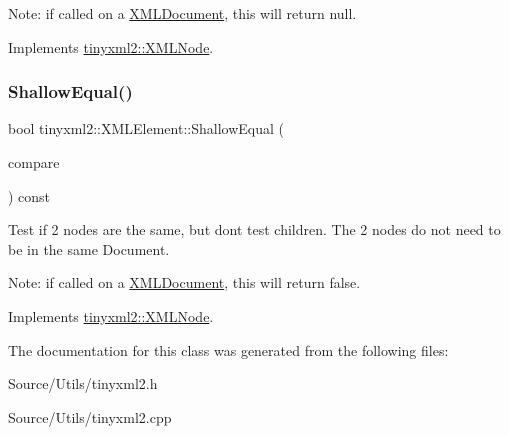 Note\+: if called on a \mbox{\hyperlink{classtinyxml2_1_1_x_m_l_document}{X\+M\+L\+Document}}, this will return null. 

Implements \mbox{\hyperlink{classtinyxml2_1_1_x_m_l_node_a8402cbd3129d20e9e6024bbcc0531283}{tinyxml2\+::\+X\+M\+L\+Node}}.

\mbox{\label{classtinyxml2_1_1_x_m_l_element_a61ffd7bf918a9db4aa6203d855ac5ec2}} 
\subsubsection{\texorpdfstring{Shallow\+Equal()}{ShallowEqual()}}
{\footnotesize\ttfamily bool tinyxml2\+::\+X\+M\+L\+Element\+::\+Shallow\+Equal (\begin{DoxyParamCaption}\item[{const \mbox{\hyperlink{classtinyxml2_1_1_x_m_l_node}{X\+M\+L\+Node}} $\ast$}]{compare }\end{DoxyParamCaption}) const\hspace{0.3cm}{\ttfamily [virtual]}}

Test if 2 nodes are the same, but don\textquotesingle{}t test children. The 2 nodes do not need to be in the same Document.

Note\+: if called on a \mbox{\hyperlink{classtinyxml2_1_1_x_m_l_document}{X\+M\+L\+Document}}, this will return false. 

Implements \mbox{\hyperlink{classtinyxml2_1_1_x_m_l_node_a7ce18b751c3ea09eac292dca264f9226}{tinyxml2\+::\+X\+M\+L\+Node}}.



The documentation for this class was generated from the following files\+:\begin{DoxyCompactItemize}
\item 
Source/\+Utils/tinyxml2.\+h\item 
Source/\+Utils/tinyxml2.\+cpp\end{DoxyCompactItemize}
